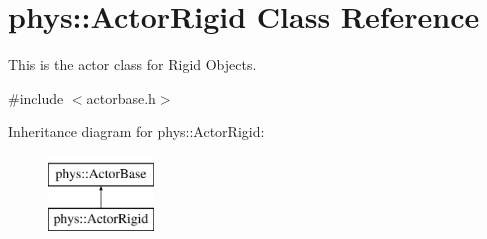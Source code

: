 \hypertarget{classphys_1_1ActorRigid}{
\section{phys::ActorRigid Class Reference}
\label{d8/d71/classphys_1_1ActorRigid}
}


This is the actor class for Rigid Objects.  




{\ttfamily \#include $<$actorbase.h$>$}

Inheritance diagram for phys::ActorRigid:\begin{figure}[H]
\begin{center}
\leavevmode
\includegraphics[height=2.000000cm]{d8/d71/classphys_1_1ActorRigid}
\end{center}
\end{figure}

